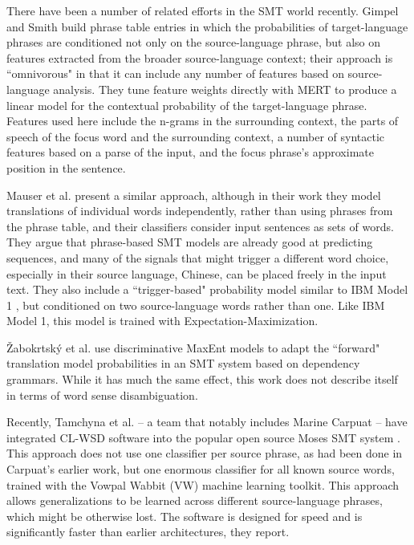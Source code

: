 There have been a number of related efforts in the SMT world recently.
Gimpel and Smith \cite{gimpel-smith:2008:WMT} build phrase table entries in
which the probabilities of target-language phrases are conditioned not only on
the source-language phrase, but also on features extracted from the broader
source-language context; their approach is ``omnivorous" in that it can include
any number of features based on source-language analysis. They tune feature
weights directly with MERT to produce a linear model for the contextual
probability of the target-language phrase. Features used here include the
n-grams in the surrounding context, the parts of speech of the focus word and
the surrounding context, a number of syntactic features based on a parse of
the input, and the focus phrase's approximate position in the sentence.

Mauser et al. \cite{mauser-hasan-ney:2009:EMNLP} present a similar approach,
although in their work they model translations of individual words
independently, rather than using phrases from the phrase table, and their
classifiers consider input sentences as sets of words. They argue that
phrase-based SMT models are already good at predicting sequences, and many of
the signals that might trigger a different word choice, especially in their
source language, Chinese, can be placed freely in the input text. They also
include a ``trigger-based" probability model similar to IBM Model 1
\cite{DBLP:journals/coling/BrownPPM94}, but conditioned on two source-language
words rather than one. Like IBM Model 1, this model is trained with
Expectation-Maximization.

Žabokrtsk\'{y} et al. \cite{vzabokrtsky-popel-marevcek:2010:WMT} use
discriminative MaxEnt models to adapt the ``forward" translation model
probabilities in an SMT system based on dependency grammars. While it has much
the same effect, this work does not describe itself in terms of word sense
disambiguation.

Recently, Tamchyna et al. -- a team that notably includes Marine Carpuat --
have integrated CL-WSD software into the popular open source Moses SMT system
\cite{tamchyna2014integrating}.
This approach does not use one classifier per source phrase, as had been done
in Carpuat's earlier work, but one enormous classifier for all known source
words, trained with the Vowpal Wabbit (VW) machine learning toolkit. This
approach allows generalizations to be learned across different source-language
phrases, which might be otherwise lost. The software is designed for speed and
is significantly faster than earlier architectures, they report.

